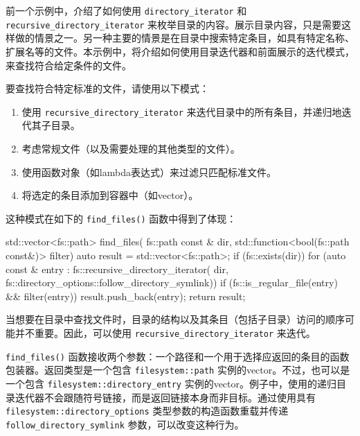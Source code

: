 前一个示例中，介绍了如何使用 \verb|directory_iterator| 和 \verb|recursive_directory_iterator| 来枚举目录的内容。展示目录内容，只是需要这样做的情景之一。另一种主要的情景是在目录中搜索特定条目，如具有特定名称、扩展名等的文件。本示例中，将介绍如何使用目录迭代器和前面展示的迭代模式，来查找符合给定条件的文件。


要查找符合特定标准的文件，请使用以下模式：

\begin{enumerate}
\item
使用 \verb|recursive_directory_iterator| 来迭代目录中的所有条目，并递归地迭代其子目录。

\item
考虑常规文件（以及需要处理的其他类型的文件）。

\item
使用函数对象（如lambda表达式）来过滤只匹配标准文件。

\item
将选定的条目添加到容器中（如vector）。
\end{enumerate}

这种模式在如下的 \verb|find_files()| 函数中得到了体现：

\begin{cpp}
std::vector<fs::path> find_files(
    fs::path const & dir,
    std::function<bool(fs::path const&)> filter)
{
    auto result = std::vector<fs::path>{};
    if (fs::exists(dir))
    {
        for (auto const & entry :
        fs::recursive_directory_iterator(
        dir,
        fs::directory_options::follow_directory_symlink))
        {
            if (fs::is_regular_file(entry) &&
            filter(entry))
            {
                result.push_back(entry);
            }
        }
    }
    return result;
}
\end{cpp}


当想要在目录中查找文件时，目录的结构以及其条目（包括子目录）访问的顺序可能并不重要。因此，可以使用 \verb|recursive_directory_iterator| 来迭代。

\verb|find_files()| 函数接收两个参数：一个路径和一个用于选择应返回的条目的函数包装器。返回类型是一个包含 \verb|filesystem::path| 实例的vector。不过，也可以是一个包含 \verb|filesystem::directory_entry| 实例的vector。例子中，使用的递归目录迭代器不会跟随符号链接，而是返回链接本身而非目标。通过使用具有 \verb|filesystem::directory_options| 类型参数的构造函数重载并传递 \verb|follow_directory_symlink| 参数，可以改变这种行为。

